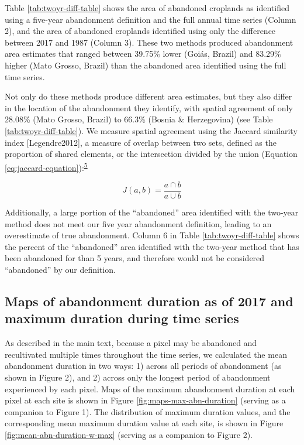 \documentclass[
]{article}
\begin{document}
Table \ref{tab:twoyr-diff-table} shows the area of abandoned croplands as identified using a five-year abandonment definition and the full annual time series (Column 2), and the area of abandoned croplands identified using only the difference between 2017 and 1987 (Column 3).
These two methods produced abandonment area estimates that ranged between 39.75\% lower (Goiás, Brazil) and 83.29\% higher (Mato Grosso, Brazil) than the abandoned area identified using the full time series.

Not only do these methods produce different area estimates, but they also differ in the location of the abandonment they identify, with spatial agreement of only 28.08\% (Mato Grosso, Brazil) to 66.3\% (Bosnia \& Herzegovina) (see Table \ref{tab:twoyr-diff-table}).
We measure spatial agreement using the Jaccard similarity index {[}Legendre2012{]}, a measure of overlap between two sets, defined as the proportion of shared elements, or the intersection divided by the union (Equation \eqref{eq:jaccard-equation}):\textsuperscript{\protect\hyperlink{ref-Legendre2012}{5}}

\begin{equation}
J(a,b) = \frac{a\cap b}{a\cup b} \label{eq:jaccard-equation}
\end{equation}

Additionally, a large portion of the ``abandoned'' area identified with the two-year method does not meet our five year abandonment definition, leading to an overestimate of true abandonment.
Column 6 in Table \ref{tab:twoyr-diff-table} shows the percent of the ``abandoned'' area identified with the two-year method that has been abandoned for than 5 years, and therefore would not be considered ``abandoned'' by our definition.

\hypertarget{maps-of-abandonment-duration-as-of-2017-and-maximum-duration-during-time-series}{%
\subsection{Maps of abandonment duration as of 2017 and maximum duration during time series}\label{maps-of-abandonment-duration-as-of-2017-and-maximum-duration-during-time-series}}

As described in the main text, because a pixel may be abandoned and recultivated multiple times throughout the time series, we calculated the mean abandonment duration in two ways: 1) across all periods of abandonment (as shown in Figure 2), and 2) across only the longest period of abandonment experienced by each pixel.
Maps of the maximum abandonment duration at each pixel at each site is shown in Figure \ref{fig:maps-max-abn-duration} (serving as a companion to Figure 1).
The distribution of maximum duration values, and the corresponding mean maximum duration value at each site, is shown in Figure \ref{fig:mean-abn-duration-w-max} (serving as a companion to Figure 2).
\end{document}
